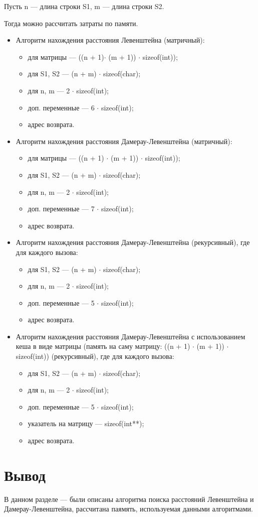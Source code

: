 Пусть n --- длина строки S1, m --- длина строки S2.

Тогда можно рассчитать затраты по памяти.
\begin{itemize}
	\item Алгоритм нахождения расстояния Левенштейна (матричный):
	\begin{itemize}
		\item для матрицы --- ((n + 1)$ \cdot$ (m + 1)) $ \cdot$ sizeof(int));
		\item для S1, S2 --- (n + m) $ \cdot$ sizeof(char);
		\item для n, m --- 2 $ \cdot$ sizeof(int);
		\item доп. переменные --- 6 $ \cdot$ sizeof(int);
		\item адрес возврата.
	\end{itemize}
	
	\item Алгоритм нахождения расстояния Дамерау-Левенштейна (матричный):
	\begin{itemize}
		\item для матрицы --- ((n + 1) $ \cdot$ (m + 1)) $ \cdot$ sizeof(int));
		\item для S1, S2 --- (n + m) $ \cdot$ sizeof(char);
		\item для n, m --- 2 $ \cdot$ sizeof(int);
		\item доп. переменные --- 7 $ \cdot$ sizeof(int);
		\item адрес возврата.
	\end{itemize}
	
	\item Алгоритм нахождения расстояния Дамерау-Левенштейна (рекурсивный), где для каждого вызова:
	\begin{itemize}
		\item для S1, S2 --- (n + m) $ \cdot$ sizeof(char);
		\item для n, m --- 2 $ \cdot$ sizeof(int);
		\item доп. переменные --- 5 $ \cdot$ sizeof(int);
		\item адрес возврата.
	\end{itemize}
	\newpage
	\item Алгоритм нахождения расстояния Дамерау-Левенштейна с использованием кеша в виде матрицы (память на саму матрицу: ((n + 1) $ \cdot$ (m + 1)) $ \cdot$ sizeof(int)) (рекурсивный), где для каждого вызова:
	\begin{itemize}
		\item для S1, S2 --- (n + m) $ \cdot$ sizeof(char);
		\item для n, m --- 2 $ \cdot$ sizeof(int);
		\item доп. переменные --- 5 $ \cdot$ sizeof(int);
		\item указатель на матрицу --- sizeof(int**);
		\item адрес возврата.
	\end{itemize}
	
\end{itemize}



\section*{Вывод}
В данном разделе --- были описаны алгоритма поиска расстояний Левенштейна и Дамерау-Левенштейна, рассчитана паямять, используемая данными алгоритмами.